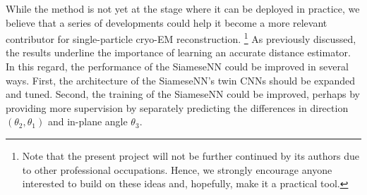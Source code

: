 While the method is not yet at the stage where it can be deployed in practice, we believe that a series of developments could help it become a more relevant contributor for single-particle cryo-EM reconstruction.%
\footnote{Note that the present project will not be further continued by its authors due to other professional occupations. Hence, we strongly encourage anyone interested to build on these ideas and, hopefully, make it a practical tool.}
As previously discussed, the results underline the importance of learning an accurate distance estimator. %
In this regard, the performance of the SiameseNN could be improved in several ways.
First, the architecture of the SiameseNN's twin CNNs should be expanded and tuned.
Second, the training of the SiameseNN could be improved, perhaps by providing more supervision by separately predicting the differences in direction $(\theta_2,\theta_1)$ and in-plane angle $\theta_3$.


